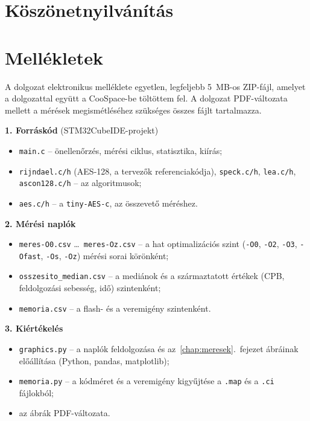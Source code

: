\documentclass[a4paper,12pt]{report}
\theoremstyle{definition}
\theoremstyle{remark}
\begin{document}
\chapter*{Köszönetnyilvánítás}



\chapter*{Mellékletek}

A dolgozat elektronikus melléklete egyetlen, legfeljebb 5~MB-os ZIP-fájl, amelyet a dolgozattal együtt a CooSpace-be töltöttem fel. A dolgozat PDF-változata mellett a mérések megismétléséhez szükséges összes fájlt tartalmazza.

\medskip
\noindent\textbf{1. Forráskód} (STM32CubeIDE-projekt)
\begin{itemize}
	\item \texttt{main.c} -- önellenőrzés, mérési ciklus, statisztika, kiírás;
	\item \texttt{rijndael.c/h} (AES-128, a tervezők referenciakódja), \texttt{speck.c/h}, \texttt{lea.c/h}, \texttt{ascon128.c/h} -- az algoritmusok;
	\item \texttt{aes.c/h} -- a \texttt{tiny-AES-c}, az összevető méréshez.
\end{itemize}

\noindent\textbf{2. Mérési naplók}
\begin{itemize}
	\item \texttt{meres-O0.csv} \ldots\ \texttt{meres-Oz.csv} -- a hat optimalizációs szint (\texttt{-O0}, \texttt{-O2}, \texttt{-O3}, \texttt{-Ofast}, \texttt{-Os}, \texttt{-Oz}) mérési sorai körönként;
	\item \texttt{osszesito\_median.csv} -- a mediánok és a származtatott értékek (CPB, feldolgozási sebesség, idő) szintenként;
	\item \texttt{memoria.csv} -- a flash- és a veremigény szintenként.
\end{itemize}

\noindent\textbf{3. Kiértékelés}
\begin{itemize}
	\item \texttt{graphics.py} -- a naplók feldolgozása és az~\ref{chap:meresek}.~fejezet ábráinak előállítása (Python, pandas, matplotlib);
	\item \texttt{memoria.py} -- a kódméret és a veremigény kigyűjtése a \texttt{.map} és a \texttt{.ci} fájlokból;
	\item az ábrák PDF-változata.
\end{itemize}
\end{document}
